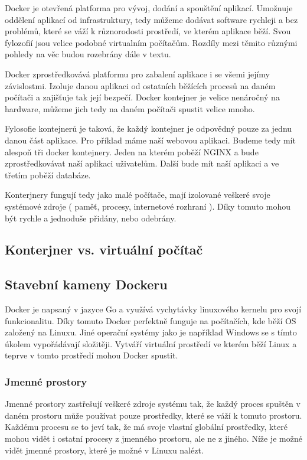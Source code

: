 \documentclass[thesis=B,czech]{FITthesis}[2019/12/23]
\begin{document}
Docker je otevřená platforma pro vývoj, dodání a spouštění aplikací. Umožnuje oddělení aplikací od infrastruktury, tedy můžeme dodávat software rychleji a bez problémů, které se váží k různorodosti prostředí, ve kterém aplikace běží. Svou fylozofií jsou velice podobné virtualním počítačům. Rozdíly mezi těmito různými pohledy na věc budou rozebrány dále v textu. 

Docker zprostředkovává platformu pro zabalení aplikace i se všemi jejímy závislostmi. Izoluje danou aplikaci od ostatních běžících procesů na daném počítači a zajišťuje tak její bezpečí. Docker kontejner je velice nenáročný na hardware, můžeme jich tedy na daném počítači spustit velice mnoho.  

Fylosofie kontejnerů je taková, že každý kontejner je odpovědný pouze za jednu danou část aplikace. Pro příklad máme naší webovou aplikaci. Budeme tedy mít alespoň tři docker kontejnery. Jeden na kterém poběží NGINX a bude zprostředkovávat naší aplikaci uživatelům. Další bude mít naší aplikaci a ve třetím poběží databáze. 

Konterjnery fungují tedy jako malé počítače, mají izolované veškeré svoje systémové zdroje ( paměť, procesy, internetové rozhraní ). Díky tomuto mohou být rychle a jednoduše přidány, nebo odebrány.  


\subsection{Konterjner vs. virtuální počítač}

\subsection{Stavební kameny Dockeru}

Docker je napsaný v jazyce Go a využívá vychytávky linuxového kernelu pro svojí funkcionalitu. Díky tomuto Docker perfektně funguje na počítačích, kde běží OS založený na Linuxu. Jiné operační systémy jako je například Windows se s tímto úkolem vypořádávají složitěji. Vytváří virtuální prostředí ve kterém běží Linux a teprve v tomto prostředí mohou Docker spustit.

\subsubsection{Jmenné prostory}

Jmenné prostory zastřešují veškeré zdroje systému tak, že každý proces spuštěn v daném prostoru může používat pouze prostředky, které se váží k tomuto prostoru. Každému procesu se to jeví tak, že má svoje vlastní globální prostředky, které mohou vidět i ostatní procesy z jmenného prostoru, ale ne z jiného. Níže je možné vidět jmenné prostory, které je možné v Linuxu nalézt.
\end{document}
